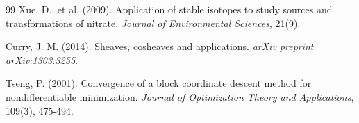 \documentclass[12pt,a4paper]{article}
\theoremstyle{plain}
\theoremstyle{definition}
\theoremstyle{remark}
\begin{document}
\begin{thebibliography}{99}
	Xue, D., et al. (2009). Application of stable isotopes to study sources and transformations of nitrate. \textit{Journal of Environmental Sciences}, 21(9).

	Curry, J. M. (2014). Sheaves, cosheaves and applications. \textit{arXiv preprint arXiv:1303.3255}.

	Tseng, P. (2001). Convergence of a block coordinate descent method for nondifferentiable minimization. \textit{Journal of Optimization Theory and Applications}, 109(3), 475-494.

\end{thebibliography}
\end{document}

